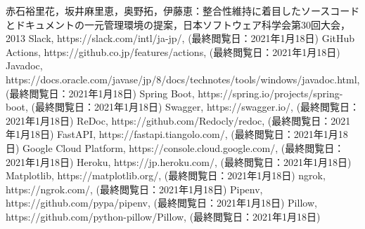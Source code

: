 \begin{thebibliography}{9}
     赤石裕里花，坂井麻里恵，奥野拓，伊藤恵：整合性維持に着目したソースコードとドキュメントの一元管理環境の提案，日本ソフトウェア科学会第30回大会，2013
     Slack, https://slack.com/intl/ja-jp/, (最終閲覧日：2021年1月18日)
     GitHub Actions, https://github.co.jp/features/actions, (最終閲覧日：2021年1月18日)
     Javadoc, https://docs.oracle.com/javase/jp/8/docs/technotes/tools/windows/javadoc.html, (最終閲覧日：2021年1月18日)
     Spring Boot, https://spring.io/projects/spring-boot, (最終閲覧日：2021年1月18日)
     Swagger, https://swagger.io/, (最終閲覧日：2021年1月18日)
     ReDoc, https://github.com/Redocly/redoc, (最終閲覧日：2021年1月18日)
     FastAPI, https://fastapi.tiangolo.com/, (最終閲覧日：2021年1月18日)
     Google Cloud Platform, https://console.cloud.google.com/, (最終閲覧日：2021年1月18日)
     Heroku, https://jp.heroku.com/, (最終閲覧日：2021年1月18日)
     Matplotlib, https://matplotlib.org/, (最終閲覧日：2021年1月18日)
     ngrok, https://ngrok.com/, (最終閲覧日：2021年1月18日)
     Pipenv, https://github.com/pypa/pipenv, (最終閲覧日：2021年1月18日)
     Pillow, https://github.com/python-pillow/Pillow, (最終閲覧日：2021年1月18日)
\end{thebibliography}